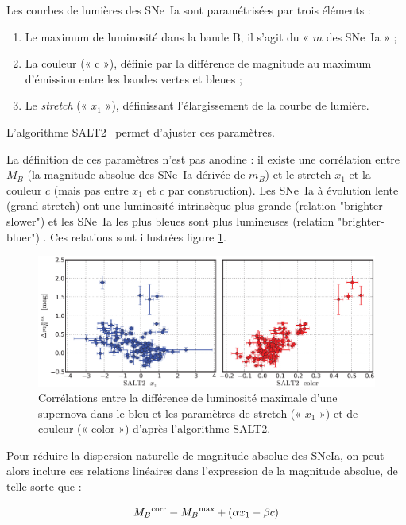 \documentclass[a4paper, 12pt, svgnames]{article}
\begin{document}
Les courbes de lumières des SNe~Ia sont paramétrisées par trois éléments :

\begin{enumerate}
    \item Le maximum de luminosité dans la bande B, il s'agit du « $m$ des
        SNe~Ia » ;
    \item La couleur (« c »), définie par la différence de magnitude au maximum
        d'émission entre les bandes vertes et bleues ;
    \item Le \textit{stretch} (« $x_1$ »), définissant l'élargissement de la
        courbe de lumière.
\end{enumerate}

L'algorithme SALT2~\cite{guy_salt2_2007, guy_supernova_2010} permet d'ajuster
ces paramètres.

La définition de ces paramètres n'est pas anodine : il existe une corrélation
entre $M_B$ (la magnitude absolue des SNe~Ia dérivée de $m_B$) et le stretch
$x_1$ et la couleur $c$ (mais pas entre $x_1$ et $c$ par construction). Les
SNe~Ia à évolution lente (grand stretch) ont une luminosité intrinsèque plus
grande (relation "brighter-slower") \cite{noauthor_absolute_nodate} et les
SNe~Ia les plus bleues sont plus lumineuses (relation "brighter-bluer")
\cite{tripp_two-parameter_1998, riess_first_2006}. Ces relations sont illustrées
figure \ref{brighter_slower_bluer}.

\begin{figure}[htbp!]
    \centering
    \includegraphics[width=.7\linewidth]{Rapport_figures/disp_x1_c.PNG}
    \captionsetup{justification=centering}
    \caption{Corrélations entre la différence de luminosité maximale d'une
    supernova dans le bleu et les paramètres de stretch (« $x_1$ ») et de
couleur (« color ») d'après l'algorithme SALT2.}
    \label{brighter_slower_bluer}
\end{figure}

Pour réduire la dispersion naturelle de magnitude absolue des SNeIa, on peut
alors inclure ces relations linéaires dans l'expression de la magnitude absolue,
de telle sorte que :

\begin{equation}
    M_B{}^{\text{corr}} \equiv M_B{}^{\text{max}} + \left(\alpha x_1 - \beta c\right)
\end{equation}
\end{document}
